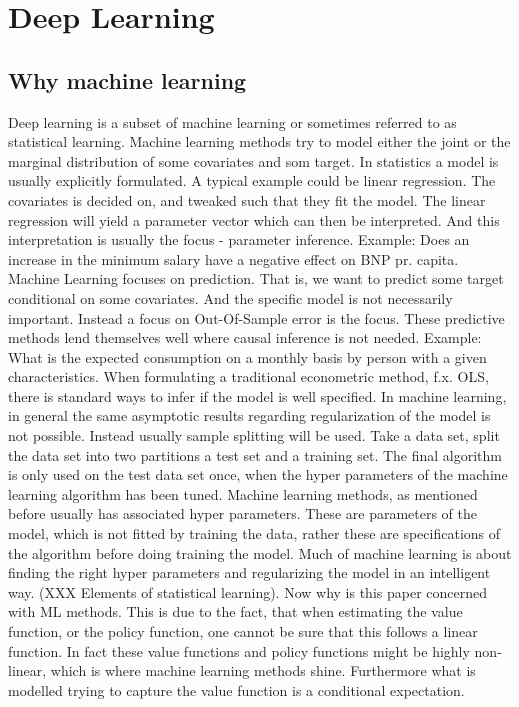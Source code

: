 \section{Deep Learning}



\subsection{Why machine learning}

Deep learning is a subset of machine learning or sometimes referred to as statistical learning. Machine learning methods try to model either the joint or the marginal distribution of some covariates and som target. In statistics a model is usually explicitly formulated. A typical example could be linear regression. The covariates is decided on, and tweaked such that they fit the model. The linear regression will yield a parameter vector which can then be interpreted. And this interpretation is usually the focus - parameter inference. Example: Does an increase in the minimum salary have a negative effect on BNP pr. capita. Machine Learning focuses on prediction. That is, we want to predict some target conditional on some covariates. And the specific model is not necessarily important. Instead a focus on Out-Of-Sample error is the focus. These predictive methods lend themselves well where causal inference is not needed. Example: What is the expected consumption on a monthly basis by person with a given characteristics. When formulating a traditional econometric method, f.x. OLS, there is standard ways to infer if the model is well specified. In machine learning, in general the same asymptotic results regarding regularization of the model is not possible. Instead usually sample splitting will be used. Take a data set, split the data set into two partitions a test set and a training set. The final algorithm is only used on the test data set once, when the hyper parameters of the machine learning algorithm has been tuned. Machine learning methods, as mentioned before usually has associated hyper parameters. These are parameters of the model, which is not fitted by training the data, rather these are specifications of the algorithm before doing training the model. Much of machine learning is about finding the right hyper parameters and regularizing the model in an intelligent way. (XXX Elements of statistical learning). Now why is this paper concerned with ML methods. This is due to the fact, that when estimating the value function, or the policy function, one cannot be sure that this follows a linear function. In fact these value functions and policy functions might be highly non-linear, which is where machine learning methods shine. Furthermore what is modelled trying to capture the value function is a conditional expectation.

